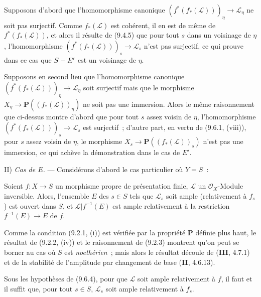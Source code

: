 Supposons d'abord que l'homomorphisme canonique
$(f^*(f_*(\mathcal L)))_\eta\to\mathcal L_\eta$ ne soit pas surjectif. Comme
$f_*(\mathcal L)$ est cohérent, il en est de même de $f^*(f_*(\mathcal L))$,
et alors il résulte de (9.4.5) que pour tout $s$ dans un voisinage de $\eta$,
l'homomorphisme $(f^*(f_*(\mathcal L)))_s\to\mathcal L_s$ n'est pas
surjectif, ce qui prouve dans ce cas que $S- E'$ est un voisinage de $\eta$.

Supposons en second lieu que l'homomorphisme canonique
$(f^*(f_*(\mathcal L)))_\eta\to\mathcal L_\eta$ soit surjectif mais que le
morphisme $X_\eta\to\mathbf P((f_*(\mathcal L))_\eta)$ ne soit pas une
immersion. Alors le même raisonnement que ci-dessus montre d'abord que pour
tout $s$ assez voisin de $\eta$, l'homomorphisme
$(f^*(f_*(\mathcal L)))_s\to\mathcal L_s$ est surjectif~; d'autre part, en
vertu de (9.6.1, (viii)), pour $s$ assez voisin de $\eta$, le morphisme
$X_s\to\mathbf P((f_*(\mathcal L))_s)$ n'est pas une immersion, ce qui achève
la démonstration dans le cas de $E'$.

II) \emph{Cas de $E$.} --- Considérons d'abord le cas particulier où $Y=S$~:

\begin{corollary}[9.6.4]
\label{IV.9.6.4-fr}
Soient $f:X\to S$ un morphisme \textup{propre} de présentation finie, $\mathcal L$ un
$\mathcal O_X$-Module inversible. Alors, l'ensemble $E$ des $s\in S$ tels que
$\mathcal L_s$ soit ample (relativement à $f_s$) est ouvert dans $S$, et
$\mathcal L|f^{-1}(E)$ est ample relativement à la restriction
$f^{-1}(E)\to E$ de $f$.
\end{corollary}

Comme la condition (9.2.1, (i)) est vérifiée par la propriété $\boldsymbol{P}$ définie plus
haut, le résultat de (9.2.2, (iv)) et le raisonnement de (9.2.3) montrent qu'on
peut se borner au cas où $S$ est \emph{noethérien}~; mais alors le résultat
découle de (\textbf{III}, 4.7.1) et de la stabilité de l'amplitude par
changement de base (\textbf{II}, 4.6.13).

\begin{corollary}[9.6.5]
\label{IV.9.6.5-fr}
Sous les hypothèses de (9.6.4), pour que $\mathcal L$ soit ample relativement
à $f$, il faut et il suffit que, pour tout $s\in S$, $\mathcal L_s$ soit ample
relativement à $f_s$.
\end{corollary}

